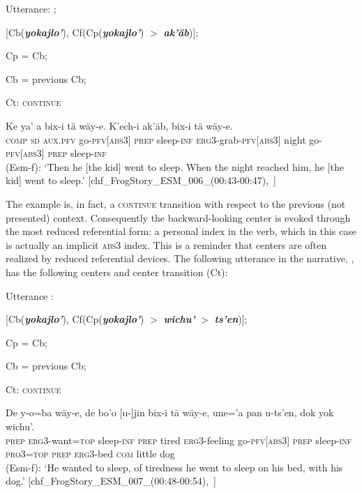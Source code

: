 \documentclass[output=paper
,modfonts
,nonflat]{langsci/langscibook}
\begin{document}
\ea
Utterance: ;

[Cb(\textbf{\textit{yokajlo'}}), Cf(Cp(\textbf{\textit{yokajlo'}}) $>$ \textbf{\textit{ak'\"ab}})];

Cp = Cb;

Cb = previous Cb;

Ct: \textsc{continue}
\z

\ea \label{ex:pico:11}
\gll   Ke ya' a bix-i tä wäy-e. K'ech-i ak'äb, bix-i tä wäy-e.\\
{\textsc{comp}} {\textsc{sd}} {\textsc{aux.pfv}} go-{\textsc{pfv[abs3]}} {\textsc{prep}} sleep-{\textsc{inf}} \textsc{erg3}-grab-{\textsc{pfv[abs3]}} night  go-{\textsc{pfv[abs3]}} {\textsc{prep}} sleep-{\textsc{inf}}\\
\glt (Esm-f): `Then he [the kid] went to sleep. When the night reached him, he [the kid] went to sleep.' [chf\_FrogStory\_ESM\_006\_(00:43-00:47),~\citealt{Delgado-Galvan2018archive}]
\z

The example  is, in fact, a \textsc{continue} transition with respect to the previous (not presented) context. Consequently the backward-looking center is evoked through the most reduced referential form: a personal index in the verb, which in this case is actually an implicit \textsc{abs3} index. This is a reminder that centers are often realized by reduced referential devices.
The following utterance in the narrative, , has the following centers and center transition (Ct):


\ea
Utterance :

[Cb(\textbf{\textit{yokajlo'}}), Cf(Cp(\textbf{\textit{yokajlo'}}) $>$ \textbf{\textit{wichu'}} $>$ \textbf{\textit{ts'en}})];

Cp = Cb;

Cb = previous Cb;

Ct: \textsc{continue}
\z

\ea \label{ex:pico:13}

\gll   De y-o=ba w\"ay-e, de bo'o [u-]jin bix-i tä wäy-e, une='a pan u-ts'en, dok yok wichu'.\\
{\textsc{prep}} {\textsc{erg3}}-want={\textsc{top}} sleep-{\textsc{inf}} {\textsc{prep}} tired \textsc{erg3}-feeling go-{\textsc{pfv[abs3]}} {\textsc{prep}} sleep-{\textsc{inf}} {\textsc{pro3}}={\textsc{top}} {\textsc{prep}} \textsc{erg3}-bed {\textsc{com}} little {dog}\\
\glt (Esm-f): `He wanted to sleep, of tiredness he went to sleep on his bed, with his dog.' [chf\_FrogStory\_ESM\_007\_(00:48-00:54),~\citealt{Delgado-Galvan2018archive}]
\z
\end{document}
